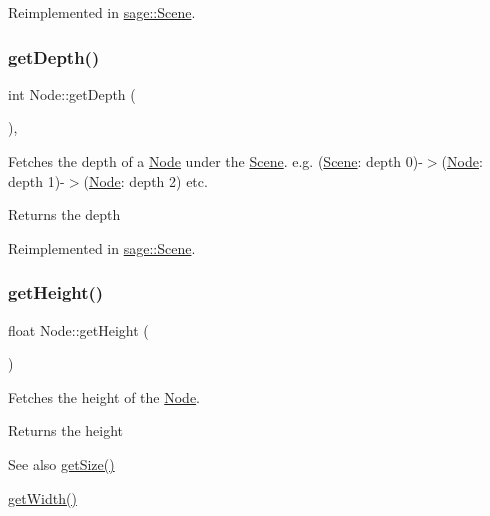 Reimplemented in \mbox{\hyperlink{classsage_1_1Scene_a30ecf9ad001d30773982f0808b05867d}{sage\+::\+Scene}}.

\mbox{\label{classsage_1_1Node_a303fffee8f70d39603b3a4e251e2e820}} 
\subsubsection{\texorpdfstring{getDepth()}{getDepth()}}
{\footnotesize\ttfamily int Node\+::get\+Depth (\begin{DoxyParamCaption}{ }\end{DoxyParamCaption})\hspace{0.3cm}{\ttfamily [protected]}, {\ttfamily [virtual]}}



Fetches the depth of a \mbox{\hyperlink{classsage_1_1Node}{Node}} under the \mbox{\hyperlink{classsage_1_1Scene}{Scene}}. e.\+g. (\mbox{\hyperlink{classsage_1_1Scene}{Scene}}\+: depth 0)-\/$>$(\mbox{\hyperlink{classsage_1_1Node}{Node}}\+: depth 1)-\/$>$(\mbox{\hyperlink{classsage_1_1Node}{Node}}\+: depth 2) etc. 

\begin{DoxyReturn}{Returns}
the depth 
\end{DoxyReturn}


Reimplemented in \mbox{\hyperlink{classsage_1_1Scene_a46335ecefda27ab0b907397a393a12f9}{sage\+::\+Scene}}.

\mbox{\label{classsage_1_1Node_a6af5a8378ac8d2c3490adbc2a03f1247}} 
\subsubsection{\texorpdfstring{getHeight()}{getHeight()}}
{\footnotesize\ttfamily float Node\+::get\+Height (\begin{DoxyParamCaption}{ }\end{DoxyParamCaption})}



Fetches the height of the \mbox{\hyperlink{classsage_1_1Node}{Node}}. 

\begin{DoxyReturn}{Returns}
the height 
\end{DoxyReturn}
\begin{DoxySeeAlso}{See also}
\mbox{\hyperlink{classsage_1_1Node_a286d3b5b0d16d31991b58cab972fb03b}{get\+Size()}} 

\mbox{\hyperlink{classsage_1_1Node_a65163ffabcfe9f482282ea37ead6fc5f}{get\+Width()}} 
\end{DoxySeeAlso}
\mbox{\label{classsage_1_1Node_a6f20a4c713eb7044d63d62fe110ebf39}} 
